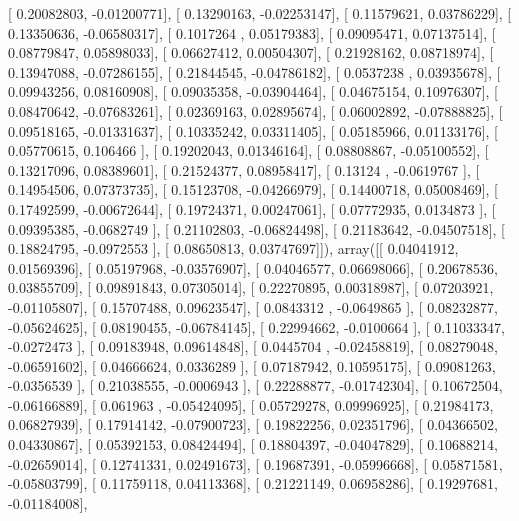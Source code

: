 \documentclass{article}
\begin{document}
       [ 0.20082803, -0.01200771],
       [ 0.13290163, -0.02253147],
       [ 0.11579621,  0.03786229],
       [ 0.13350636, -0.06580317],
       [ 0.1017264 ,  0.05179383],
       [ 0.09095471,  0.07137514],
       [ 0.08779847,  0.05898033],
       [ 0.06627412,  0.00504307],
       [ 0.21928162,  0.08718974],
       [ 0.13947088, -0.07286155],
       [ 0.21844545, -0.04786182],
       [ 0.0537238 ,  0.03935678],
       [ 0.09943256,  0.08160908],
       [ 0.09035358, -0.03904464],
       [ 0.04675154,  0.10976307],
       [ 0.08470642, -0.07683261],
       [ 0.02369163,  0.02895674],
       [ 0.06002892, -0.07888825],
       [ 0.09518165, -0.01331637],
       [ 0.10335242,  0.03311405],
       [ 0.05185966,  0.01133176],
       [ 0.05770615,  0.106466  ],
       [ 0.19202043,  0.01346164],
       [ 0.08808867, -0.05100552],
       [ 0.13217096,  0.08389601],
       [ 0.21524377,  0.08958417],
       [ 0.13124   , -0.0619767 ],
       [ 0.14954506,  0.07373735],
       [ 0.15123708, -0.04266979],
       [ 0.14400718,  0.05008469],
       [ 0.17492599, -0.00672644],
       [ 0.19724371,  0.00247061],
       [ 0.07772935,  0.0134873 ],
       [ 0.09395385, -0.0682749 ],
       [ 0.21102803, -0.06824498],
       [ 0.21183642, -0.04507518],
       [ 0.18824795, -0.0972553 ],
       [ 0.08650813,  0.03747697]]), array([[ 0.04041912,  0.01569396],
       [ 0.05197968, -0.03576907],
       [ 0.04046577,  0.06698066],
       [ 0.20678536,  0.03855709],
       [ 0.09891843,  0.07305014],
       [ 0.22270895,  0.00318987],
       [ 0.07203921, -0.01105807],
       [ 0.15707488,  0.09623547],
       [ 0.0843312 , -0.0649865 ],
       [ 0.08232877, -0.05624625],
       [ 0.08190455, -0.06784145],
       [ 0.22994662, -0.0100664 ],
       [ 0.11033347, -0.0272473 ],
       [ 0.09183948,  0.09614848],
       [ 0.0445704 , -0.02458819],
       [ 0.08279048, -0.06591602],
       [ 0.04666624,  0.0336289 ],
       [ 0.07187942,  0.10595175],
       [ 0.09081263, -0.0356539 ],
       [ 0.21038555, -0.0006943 ],
       [ 0.22288877, -0.01742304],
       [ 0.10672504, -0.06166889],
       [ 0.061963  , -0.05424095],
       [ 0.05729278,  0.09996925],
       [ 0.21984173,  0.06827939],
       [ 0.17914142, -0.07900723],
       [ 0.19822256,  0.02351796],
       [ 0.04366502,  0.04330867],
       [ 0.05392153,  0.08424494],
       [ 0.18804397, -0.04047829],
       [ 0.10688214, -0.02659014],
       [ 0.12741331,  0.02491673],
       [ 0.19687391, -0.05996668],
       [ 0.05871581, -0.05803799],
       [ 0.11759118,  0.04113368],
       [ 0.21221149,  0.06958286],
       [ 0.19297681, -0.01184008],
\end{document}

